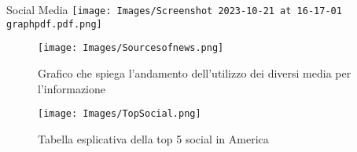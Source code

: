 \documentclass{beamer}
\begin{document}
\begin{frame}{Social Media}
    \texttt{[image: Images/Screenshot 2023-10-21 at 16-17-01 graphpdf.pdf.png]}
    \caption{Grafico che sintetizza le percentuali di utilizzo dei media in Europa.}
    \label{F:utilizzosocialEU}
\end{frame}

\begin{frame}
    \begin{figure}
    \texttt{[image: Images/Sourcesofnews.png]}
    \caption{Grafico che spiega l'andamento dell'utilizzo dei diversi media per l'informazione}
    \label{F:graficomezz}
    \end{figure}
\end{frame}

\begin{frame}
\begin{figure}
\texttt{[image: Images/TopSocial.png]}
    \caption{Tabella esplicativa della top 5 social in America}
    \label{F:social}
\end{figure}
\end{frame}



    
\end{document}
